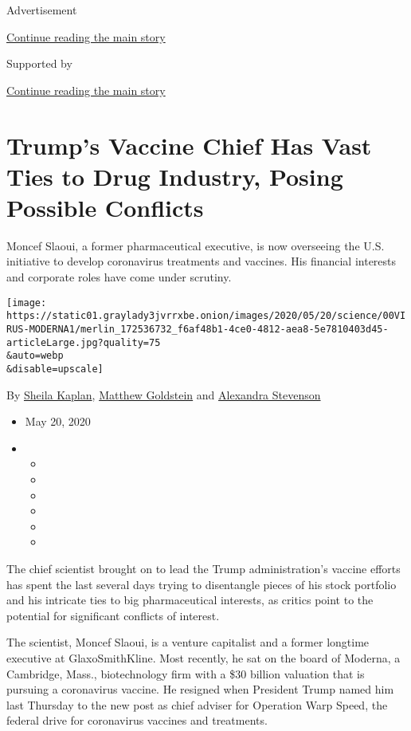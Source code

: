 Advertisement

\protect\hyperlink{after-top}{Continue reading the main story}

Supported by

\protect\hyperlink{after-sponsor}{Continue reading the main story}

\hypertarget{trumps-vaccine-chief-has-vast-ties-to-drug-industry-posing-possible-conflicts}{%
\section{Trump's Vaccine Chief Has Vast Ties to Drug Industry, Posing
Possible
Conflicts}\label{trumps-vaccine-chief-has-vast-ties-to-drug-industry-posing-possible-conflicts}}

Moncef Slaoui, a former pharmaceutical executive, is now overseeing the
U.S. initiative to develop coronavirus treatments and vaccines. His
financial interests and corporate roles have come under scrutiny.

\texttt{[image: https://static01.graylady3jvrrxbe.onion/images/2020/05/20/science/00VIRUS-MODERNA1/merlin\_172536732\_f6af48b1-4ce0-4812-aea8-5e7810403d45-articleLarge.jpg?quality=75\\\&auto=webp\\\&disable=upscale]}

By \href{https://www.nytimes3xbfgragh.onion/by/sheila-kaplan}{Sheila
Kaplan},
\href{https://www.nytimes3xbfgragh.onion/by/matthew-goldstein}{Matthew
Goldstein} and
\href{https://www.nytimes3xbfgragh.onion/by/alexandra-stevenson}{Alexandra
Stevenson}

\begin{itemize}
\item
  May 20, 2020
\item
  \begin{itemize}
  \item
  \item
  \item
  \item
  \item
  \item
  \end{itemize}
\end{itemize}

The chief scientist brought on to lead the Trump administration's
vaccine efforts has spent the last several days trying to disentangle
pieces of his stock portfolio and his intricate ties to big
pharmaceutical interests, as critics point to the potential for
significant conflicts of interest.

The scientist, Moncef Slaoui, is a venture capitalist and a former
longtime executive at GlaxoSmithKline. Most recently, he sat on the
board of Moderna, a Cambridge, Mass., biotechnology firm with a \$30
billion valuation that is pursuing a coronavirus vaccine. He resigned
when President Trump named him last Thursday to the new post as chief
adviser for Operation Warp Speed, the federal drive for coronavirus
vaccines and treatments.

